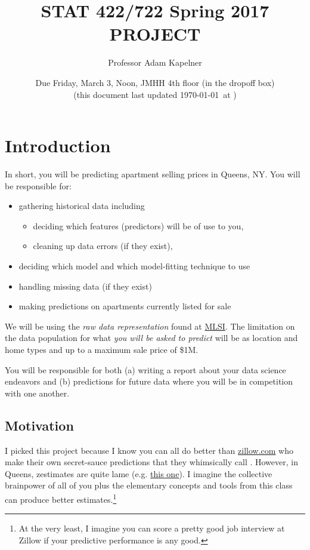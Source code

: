 \documentclass[12pt]{article}
\title{STAT 422/722 Spring 2017 PROJECT}
\author{Professor Adam Kapelner}
\date{Due Friday, March 3, Noon, JMHH 4th floor (in the dropoff box)\\ \vspace{0.5cm} \footnotesize (this document last updated \today ~at \currenttime)}
\begin{document}
\maketitle

\section{Introduction}

In short, you will be predicting apartment selling prices in Queens, NY. You will be responsible for:

\begin{itemize}
\item gathering historical data including
\begin{itemize}
\item deciding which features (predictors) will be of use to you,
\item cleaning up data errors (if they exist),
\end{itemize}
\item deciding which model and which model-fitting technique to use
\item handling missing data (if they exist)
\item making predictions on apartments currently listed for sale
\end{itemize}

We will be using the \emph{raw data representation} found at \href{http://www.mlsli.com/}{MLSI}. The limitation on the data population for what \emph{you will be asked to predict} will be  as location and home types  and  up to a maximum sale price of \$1M.

You will be responsible for both (a) writing a report about your data science endeavors and (b) predictions for future data where you will be in competition with one another.

\subsection{Motivation}

I picked this project because I know you can all do better than \url{zillow.com} who make their own secret-sauce predictions that they whimsically call . However, in Queens, zestimates are quite lame (e.g. \href{http://www.zillow.com/homes/recently_sold/Queens-New-York-NY/condo,apartment_duplex_type/2096496075_zpid/270915_rid/globalrelevanceex_sort/40.890158,-73.462143,40.452172,-74.200287_rect/10_zm/}{this one}). I imagine the collective brainpower of all of you plus the elementary concepts and tools from this class can produce better estimates.\footnote{At the very least, I imagine you can score a pretty good job interview at Zillow if your predictive performance is any good.}
\end{document}
